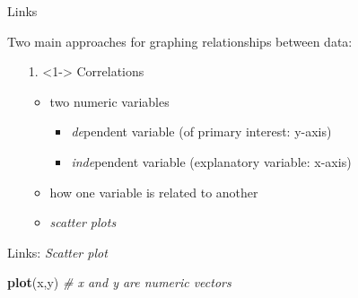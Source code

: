 \documentclass[ignorenonframetext,t]{beamer}
\newenvironment{Shaded}{\begin{snugshade}}{\end{snugshade}}
\newcommand{\KeywordTok}[1]{\textcolor[rgb]{0.13,0.29,0.53}{\textbf{#1}}}
\newcommand{\CommentTok}[1]{\textcolor[rgb]{0.56,0.35,0.01}{\textit{#1}}}
\newcommand{\NormalTok}[1]{#1}
\begin{document}
\begin{frame}{Links}

Two main approaches for graphing relationships between data:

\vspace{0.06cm}

\begin{itemize}
\item[1.]<1-> Correlations
  \begin{itemize}
  \item<1-> two numeric variables
    \begin{itemize}
    \item<1-> \emph{de}pendent variable (of primary interest: y-axis)
    \item<1-> \emph{inde}pendent variable (explanatory variable: x-axis)
    \end{itemize}
  \item<1-> how one variable is related to another
  \item<1-> \emph{scatter plots}
  \end{itemize}
\end{itemize}

\end{frame}

\begin{frame}[fragile]{Links: \emph{Scatter plot}}

\begin{Shaded}
\begin{Highlighting}[]
\KeywordTok{plot}\NormalTok{(x,y) }\CommentTok{# x and y are numeric vectors}
\end{Highlighting}
\end{Shaded}


\end{frame}
\end{document}
